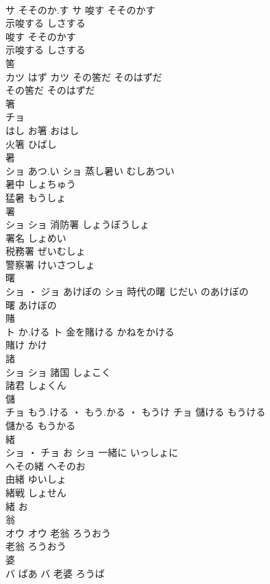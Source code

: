 \documentclass[8pt]{extreport}
\begin{document}
\begin{CJK}{UTF8}{min}
\\	サ	そそのか.す	サ	唆す	そそのかす	
\\	示唆する	しさする	
\\	唆す	そそのかす	
\\	示唆する	しさする	
\\	筈	
\\	カツ	はず	カツ	その筈だ	そのはずだ	
\\	その筈だ	そのはずだ	
\\	箸	
\\	チョ
\\	はし		お箸	おはし	
\\	火箸	ひばし	
\\	暑	
\\	ショ	あつ.い	ショ	蒸し暑い	むしあつい	
\\	暑中	しょちゅう	
\\	猛暑	もうしょ	
\\	署	
\\	ショ		ショ	消防署	しょうぼうしょ	
\\	署名	しょめい	
\\	税務署	ぜいむしょ	
\\	警察署	けいさつしょ	
\\	曙	
\\	ショ ・ ジョ	あけぼの	ショ	時代の曙	じだい のあけぼの	
\\	曙	あけぼの	
\\	賭	
\\	ト	か.ける	ト	金を賭ける	かねをかける	
\\	賭け	かけ	
\\	諸	
\\	ショ		ショ	諸国	しょこく	
\\	諸君	しょくん	
\\	儲	
\\	チョ	もう.ける ・ もう.かる ・ もうけ	チョ	儲ける	もうける	
\\	儲かる	もうかる	
\\	緒	
\\	ショ ・ チョ	お	ショ	一緒に	いっしょに	
\\	へその緒	へそのお	
\\	由緒	ゆいしょ	
\\	緒戦	しょせん	
\\	緒	お	
\\	翁	
\\	オウ		オウ	老翁	ろうおう	
\\	老翁	ろうおう	
\\	婆	
\\	バ	ばあ	バ	老婆	ろうば	

\end{CJK}
\end{document}
